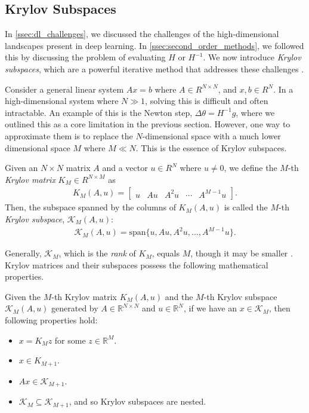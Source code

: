 \subsection{Krylov Subspaces}
\label{ssec:krylov_subspaces}

In \cref{ssec:dl_challenges}, we discussed the challenges of the high-dimensional landscapes present in deep learning. In \cref{ssec:second_order_methods}, we followed this by discussing the problem of evaluating $H$ or $H^{-1}$. We now introduce \textit{Krylov subspaces}, which are a powerful iterative method that addresses these challenges \citep{NoceWrig06,krylov_book}.

Consider a general linear system $Ax = b$ where $A \in R^{N \times N}$, and $x, b \in R^{N}$. In a high-dimensional system where $N \gg 1$, solving this is difficult and often intractable. An example of this is the Newton step, $\Delta \theta = H^{-1} g$, where we outlined this as a core limitation in the previous section. However, one way to approximate them is to replace the $N$-dimensional space with a much lower dimensional space $M$ where $M \ll N$. This is the essence of Krylov subspaces.

\begin{definition}
    Given an $N \times N$ matrix $A$ and a vector $u \in R^N$ where $u \neq 0$, we define the $M$-th \textit{Krylov matrix} $K_M \in R^{N \times M}$ as
    \begin{align}
        K_M(A, u) = \begin{bmatrix} u & A u & A^2 u & \cdots & A^{M-1} u \end{bmatrix}.
        \label{eq:krylov_matrix}
    \end{align}
    Then, the subspace spanned by the columns of $K_M(A, u)$ is called the $M$-th \textit{Krylov subspace}, $\mathcal{K}_M(A, u)$:
    \begin{align}
        \mathcal{K}_M(A, u) = \text{span} \{u, A u, A^2 u, \ldots, A^{M-1} u \}.
    \end{align}
\end{definition}

Generally, $\mathcal{K}_M$, which is the \textit{rank} of $K_M$, equals $M$, though it may be smaller \citep{bloghvp}. Krylov matrices and their subspaces possess the following mathematical properties.
\begin{definition}
    Given the $M$-th Krylov matrix $K_M(A, u)$ and the $M$-th Krylov subspace $\mathcal{K}_M(A, u)$ generated by $A \in \mathbb{R}^{N \times N}$ and $u \in \mathbb{R}^N$, if we have an $x \in \mathcal{K}_M$, then following properties hold:
    \begin{itemize}
        \item $x = K_M z$ for some $z \in \mathbb{R}^M$.
        \item $x \in K_{M+1}$.
        \item $A x \in \mathcal{K}_{M+1}$.
        \item $\mathcal{K}_M \subseteq \mathcal{K}_{M+1}$, and so Krylov subspaces are nested.
    \end{itemize}
    \label{definition:krylov_properties}
\end{definition}

